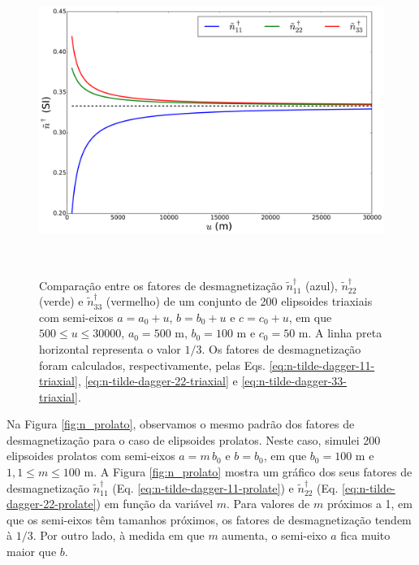 \begin{figure}[hbt!]
	\centering \includegraphics[width=15cm,height=10cm]{figures/test_n_triaxial}
	\caption[Comparação entre os fatores de desmagnetização
	$\tilde{n}^{\dagger}_{11}$ (azul), $\tilde{n}^{\dagger}_{22}$ (verde) e $\tilde{n}^{\dagger}_{33}$ (vermelho) de um conjunto de 200 elipsoides triaxiais com semi-eixos $a = a_0 + u$, $b = b_0 + u$ e $c = c_0 + u$, em que $500 \le u \le 30000$, $a_0 = 500$ m, $b_0 = 100$ m e $c_0 = 50$ m. A linha preta horizontal representa o valor $1/3$. Os fatores de desmagnetização foram calculados, respectivamente, pelas Eqs. \ref{eq:n-tilde-dagger-11-triaxial}, \ref{eq:n-tilde-dagger-22-triaxial} e \ref{eq:n-tilde-dagger-33-triaxial}.]{Comparação entre os fatores de desmagnetização
		$\tilde{n}^{\dagger}_{11}$ (azul), $\tilde{n}^{\dagger}_{22}$ (verde) e $\tilde{n}^{\dagger}_{33}$ (vermelho) de um conjunto de 200 elipsoides triaxiais com semi-eixos $a = a_0 + u$, $b = b_0 + u$ e $c = c_0 + u$, em que $500 \le u \le 30000$, $a_0 = 500$ m, $b_0 = 100$ m e $c_0 = 50$ m. A linha preta horizontal representa o valor $1/3$. Os fatores de desmagnetização foram calculados, respectivamente, pelas Eqs. \ref{eq:n-tilde-dagger-11-triaxial}, \ref{eq:n-tilde-dagger-22-triaxial} e \ref{eq:n-tilde-dagger-33-triaxial}.}
	\label{fig:n_triaxial}
\end{figure}

Na Figura \ref{fig:n_prolato}, observamos o mesmo padrão dos fatores de desmagnetização para o caso de elipsoides prolatos. Neste caso, simulei 200 elipsoides prolatos com semi-eixos $a=m\, b_0$ e $b=b_0$, em que $b_0=100$ m e $1,1 \le m \le 100$ m. A Figura \ref{fig:n_prolato} mostra um gráfico dos seus fatores de desmagnetização $\tilde{n}^{\dagger}_{11}$ (Eq. \ref{eq:n-tilde-dagger-11-prolate}) e $\tilde{n}^{\dagger}_{22}$ (Eq. \ref{eq:n-tilde-dagger-22-prolate}) em função da variável $m$.
Para valores de $m$ próximos a 1, em que os semi-eixos têm tamanhos próximos, os fatores de desmagnetização tendem à $1/3$. Por outro lado, à medida em que $m$ aumenta, o semi-eixo $a$ fica muito maior que $b$.

